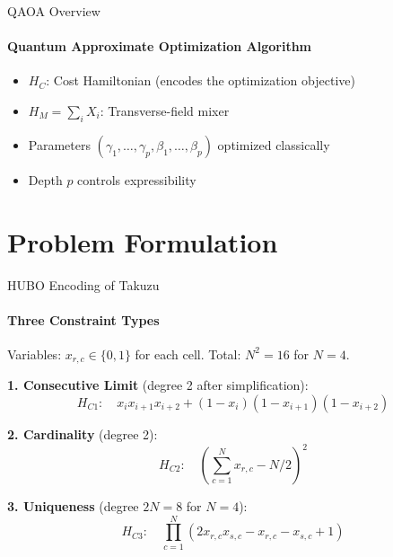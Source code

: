 \documentclass[aspectratio=169, t]{beamer}
\begin{document}
\begin{frame}{QAOA Overview}
\framesubtitle{Quantum Approximate Optimization Algorithm \cite{farhi2014qaoa}}

\begin{center}
\end{center}

\bigskip
\begin{itemize}
    \item $H_C$: Cost Hamiltonian (encodes the optimization objective)
    \item $H_M = \sum_i X_i$: Transverse-field mixer
    \item Parameters $(\gamma_1,\ldots,\gamma_p, \beta_1,\ldots,\beta_p)$ optimized classically
    \item Depth $p$ controls expressibility
\end{itemize}
\end{frame}

\section{Problem Formulation}

\begin{frame}{HUBO Encoding of Takuzu}
\framesubtitle{Three Constraint Types}

Variables: $x_{r,c} \in \{0,1\}$ for each cell. Total: $N^2 = 16$ for $N=4$.

\bigskip
\textbf{1. Consecutive Limit} (degree 2 after simplification):
$$H_{C1}: \quad x_i x_{i+1} x_{i+2} + (1-x_i)(1-x_{i+1})(1-x_{i+2})$$

\bigskip
\textbf{2. Cardinality} (degree 2):
$$H_{C2}: \quad \left(\sum_{c=1}^N x_{r,c} - N/2\right)^2$$

\bigskip
\textbf{3. Uniqueness} (degree $2N = 8$ for $N=4$):
$$H_{C3}: \quad \prod_{c=1}^N \left(2x_{r,c}x_{s,c} - x_{r,c} - x_{s,c} + 1\right)$$
\end{frame}
\end{document}
